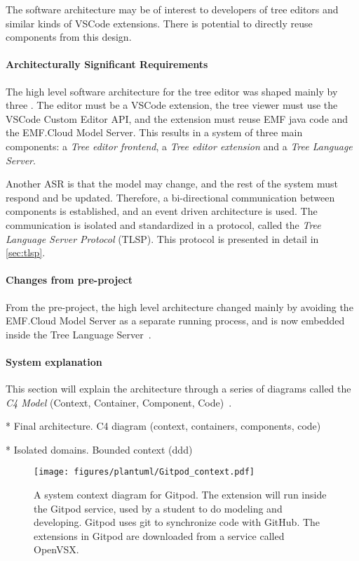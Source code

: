The software architecture may be of interest to developers of tree editors and similar kinds of \gls{VSCode} extensions.
There is potential to directly reuse components from this design.

\paragraph{Architecturally Significant Requirements}
The high level software architecture for the tree editor was shaped mainly by three .
The editor must be a \gls{VSCode} extension, the tree viewer must use the \gls{VSCode} Custom Editor \gls{API}, and the extension must reuse \acrshort{EMF} java code and the EMF.Cloud Model Server.
This results in a system of three main components: a \textit{Tree editor frontend}, a \textit{Tree editor extension} and a \textit{Tree Language Server}.

Another \acrshort{ASR} is that the model may change, and the rest of the system must respond and be updated.
Therefore, a bi-directional communication between components is established, and an event driven architecture is used.
The communication is isolated and standardized in a protocol, called the \textit{Tree Language Server Protocol} (\acrshort{TLSP}).
This protocol is presented in detail in \cref{sec:tlsp}.


\paragraph{Changes from pre-project}
From the pre-project, the high level architecture changed mainly by avoiding the EMF.Cloud Model Server as a separate running process, and is now embedded inside the Tree Language Server~\cite[p.~49]{rekstadModelingEnvironmentCloud2020}.

\paragraph{System explanation}
This section will explain the architecture through a series of diagrams called the \textit{C4 Model} (Context, Container, Component, Code)~\cite{simonbrownC4ModelVisualising}.

* Final architecture. C4 diagram (context, containers, components, code)

* Isolated domains. Bounded context (ddd)

\begin{figure}[htbp]  %
  \centering
  \texttt{[image: figures/plantuml/Gitpod\_context.pdf]}
  \caption[System context diagram for Gitpod]{A system context diagram for Gitpod. The extension will run inside the Gitpod service, used by a student to do modeling and developing. Gitpod uses git to synchronize code with GitHub. The extensions in Gitpod are downloaded from a service called OpenVSX.}\label{fig:gitpod-system-context}
\end{figure}


